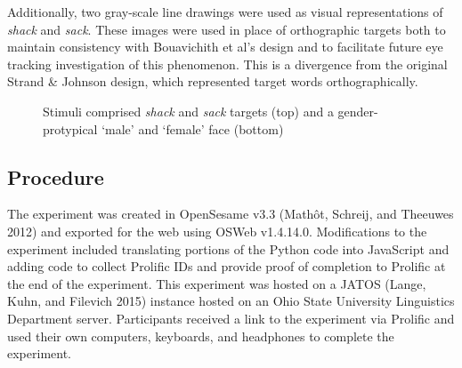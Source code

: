 \documentclass[
  letterpaper,
  DIV=11,
  numbers=noendperiod]{scrartcl}
\begin{document}
Additionally, two gray-scale line drawings were used as visual
representations of \emph{shack} and \emph{sack}. These images were used
in place of orthographic targets both to maintain consistency with
Bouavichith et al's design and to facilitate future eye tracking
investigation of this phenomenon. This is a divergence from the original
Strand \& Johnson design, which represented target words
orthographically.

\begin{figure}


\caption{\label{fig-visual}Stimuli comprised \emph{shack} and
\emph{sack} targets (top) and a gender-protypical `male' and `female'
face (bottom)}

\end{figure}%

\subsection{Procedure}\label{sec-procedure}

The experiment was created in OpenSesame v3.3 (Mathôt, Schreij, and
Theeuwes 2012) and exported for the web using OSWeb v1.4.14.0.
Modifications to the experiment included translating portions of the
Python code into JavaScript and adding code to collect Prolific IDs and
provide proof of completion to Prolific at the end of the experiment.
This experiment was hosted on a JATOS (Lange, Kuhn, and Filevich 2015)
instance hosted on an Ohio State University Linguistics Department
server. Participants received a link to the experiment via Prolific and
used their own computers, keyboards, and headphones to complete the
experiment.
\end{document}
